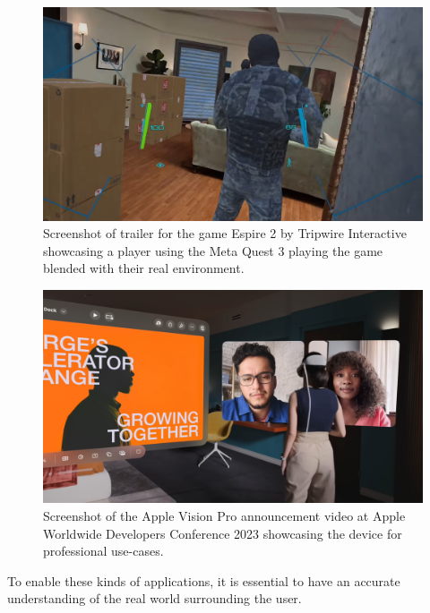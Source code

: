 \begin{figure}[h!t]
    \centering
    \includegraphics[width=0.8\linewidth]{images/Tripwire Interactive - Espire 2 Mixed Reality Update Trailer [50DD3XwjOIA - 2001x1126 - 0m21s]}
    \caption{Screenshot of trailer for the game Espire 2 by Tripwire Interactive showcasing a player using the Meta Quest 3 playing the game blended with their real environment.}
    \label{fig:quest3-example}
\end{figure}

\begin{figure}[h!t]
    \centering
    \includegraphics[width=0.8\linewidth]{images/Apple - Introducing Apple Vision Pro [TX9qSaGXFyg - 2001x1126 - 4m41s]}
    \caption{Screenshot of the Apple Vision Pro announcement video at Apple Worldwide Developers Conference 2023 showcasing the device for professional use-cases.}
    \label{fig:visonpro-example}
\end{figure}

To enable these kinds of applications, it is essential to have an accurate understanding of the real world surrounding the user.



